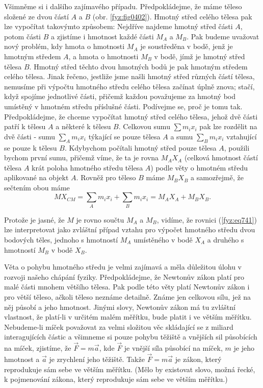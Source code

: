     Všimněme si i dalšího zajímavého případu. Předpokládejme, že máme těleso složené ze dvou částí
    \(A\) a \(B\) (obr. \ref{fyz:fig0402}). Hmotný střed celého tělesa pak lze vypočítat takovýmto
    způsobem: Nejdříve najdeme hmotný střed části \(A\), potom části \(B\) a zjistíme i hmotnost
    každé části \(M_A\) a \(M_B\). Pak budeme uvažovat nový problém, kdy hmota o hmotnosti \(M_A\)
    je soustředěna v bodě, jenž je hmotným středem \(A\), a hmota o hmotnosti \(M_B\) v bodě, jímž
    je hmotný střed tělesa \(B\). Hmotný střed těchto dvou hmotných bodů je pak hmotným středem
    celého tělesa. Jinak řečeno, jestliže jsme našli hmotný střed různých částí tělesa, nemusíme při
    výpočtu hmotného středu celého tělesa začínat úplně znova; stačí, když spojíme jednotlivé části,
    přičemž každou považujeme za hmotný bod umístěný v hmotném středu příslušné části. Podívejme se,
    proč je tomu tak. Předpokládejme, že chceme vypočítat hmotný střed celého tělesa, jehož dvě
    části patří k tělesu \(A\) a některé k tělesu \(B\). Celkovou sumu \(∑m_ix_i\) pak lze rozdělit
    na dvě části - sumu \(∑_Am_ix_i\) týkající se pouze tělesa \(A\) a sumu \(∑_Bm_ix_i\) vztahující
    se pouze k tělesu \(B\). Kdybychom počítali hmotný střed pouze tělesa \(A\), použili bychom
    první sumu, přičemž víme, že ta je rovna \(M_AX_A\) (celková hmotnost částí tělesa \(A\) krát
    poloha hmotného středu tělesa \(A\)) podle věty o hmotném středu aplikované na objekt \(A\).
    Rovněž pro těleso \(B\) máme \(M_BX_B\) a samozřejmě, že sečtením obou máme
    \begin{equation}\label{fyz:eq741}
      MX_{CM}=∑_Am_ix_i+∑_Bm_ix_i=M_AX_A+M_BX_B.
    \end{equation}

    Protože je jasné, že \(M\) je rovno součtu \(M_A\) a \(M_B\), vidíme, že rovnici
    (\ref{fyz:eq741}) lze interpretovat jako zvláštní případ vztahu pro výpočet hmotného středu dvou
    bodových těles, jednoho s hmotností \(M_A\) umístěného v bodě \(X_A\) a druhého s hmotností
    \(M_B\) v bodě \(X_B\).

    Věta o pohybu hmotného středu je velmi zajímavá a měla důležitou úlohu v rozvoji našeho chápání
    fyziky. Předpokládejme, že Newtonův zákon platí pro malé části mnohem většího tělesa. Pak podle
    této věty platí Newtonův zákon i pro větší těleso, ačkoli těleso neznáme detailně. Známe jen
    celkovou sílu, jež na něj působí a jeho hmotnost. Jinými slovy, Newtonův zákon má tu zvláštní
    vlastnost, že platí-li v určitém malém měřítku, bude platit i ve větším měřítku. Nebudeme-li
    míček považovat za velmi složitou věc skládající se z miliard interagujících částic a všimneme
    si pouze pohybu těžiště a vnějších sil působících na míček, zjistíme, že \(\vec{F}= m\vec{a}\),
    kde \(\vec{F}\) je vnější síla působící na míček, \(m\) je jeho hmotnost a \(\vec{a}\) je
    zrychlení jeho těžiště. Takže \(\vec{F}= m\vec{a}\) je zákon, který reprodukuje sám sebe ve
    větším měřítku. (Mělo by existovat slovo, možná řecké, k pojmenování zákona, který reprodukuje
    sám sebe ve větším měřítku.)

